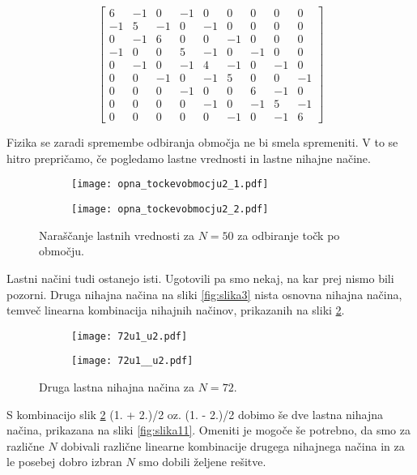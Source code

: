 \documentclass[12pt,a4paper]{article}
\begin{document}
\begin{equation*}
\begin{bmatrix}
6 & -1 & 0 & -1 & 0 & 0 & 0 & 0 & 0 \\
-1 & 5 & -1 & 0 & -1 & 0 & 0 & 0 & 0 \\
0 & -1 & 6 & 0 & 0 & -1 & 0 & 0 & 0 \\
-1 & 0 & 0 & 5 & -1 & 0 & -1 & 0 & 0 \\
0 & -1 & 0 & -1 & 4 & -1 & 0 & -1 & 0 \\
0 & 0 & -1 & 0 & -1 & 5 & 0 & 0 & -1 \\
0 & 0 & 0 & -1 & 0 & 0 & 6 & -1 & 0 \\
0 & 0 & 0 & 0 & -1 & 0 & -1 & 5 & -1 \\
0 & 0 & 0 & 0 & 0 & -1 & 0 & -1 & 6 
\end{bmatrix}  
\end{equation*}

\newpage Fizika se zaradi spremembe odbiranja območja ne bi smela spremeniti. V to se hitro prepričamo, če pogledamo lastne vrednosti in lastne nihajne načine.

\begin{figure}[H]
    \centering
    \begin{subfigure}[b]{0.49\textwidth}
        \texttt{[image: opna\_tockevobmocju2\_1.pdf]}
    \end{subfigure}
    \begin{subfigure}[b]{0.49\textwidth}
        \texttt{[image: opna\_tockevobmocju2\_2.pdf]}
    \end{subfigure}
    \caption{Naraščanje  lastnih vrednosti za $N=50$ za odbiranje točk po območju.} \label{fig:slika9}
\end{figure}

\noindent Lastni načini tudi ostanejo isti. Ugotovili pa smo nekaj, na kar prej nismo bili pozorni. Druga nihajna načina na sliki \ref{fig:slika3} nista osnovna nihajna načina, temveč linearna kombinacija nihajnih načinov, prikazanih na sliki \ref{fig:slika10}.

\begin{figure}[H]
    \centering
    \begin{subfigure}[b]{0.49\textwidth}
        \texttt{[image: 72u1\_u2.pdf]}
    \end{subfigure}
    \begin{subfigure}[b]{0.49\textwidth}
        \texttt{[image: 72u1\_\_u2.pdf]}
    \end{subfigure}
    \caption{Druga lastna nihajna načina za $N=72$.} \label{fig:slika10}
\end{figure}
S kombinacijo slik \ref{fig:slika10} (1. + 2.)/2 oz. (1. - 2.)/2 dobimo še dve lastna nihajna načina, prikazana na sliki \ref{fig:slika11}. Omeniti je mogoče še potrebno, da smo za različne $N$ dobivali različne linearne kombinacije drugega nihajnega načina in za le posebej dobro izbran $N$ smo dobili željene rešitve.
\end{document}
